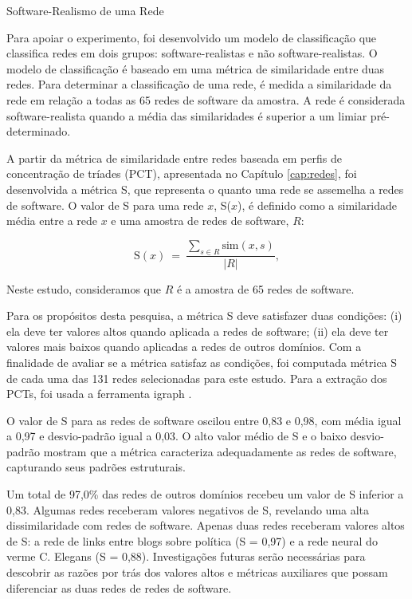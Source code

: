 \begin{section}{Software-Realismo de uma Rede} \label{sec:realismo-rede}

Para apoiar o experimento, foi desenvolvido um modelo de classificação que classifica redes em dois grupos: software-realistas e não software-realistas. O modelo de classificação é baseado em uma métrica de similaridade entre duas redes. Para determinar a classificação de uma rede, é medida a similaridade da rede em relação a todas as 65 redes de software da amostra. A rede é considerada software-realista quando a média das similaridades é superior a um limiar pré-determinado.

A partir da métrica de similaridade entre redes baseada em perfis de concentração de tríades (PCT), apresentada no Capítulo \ref{cap:redes}, foi desenvolvida a métrica S, que representa o quanto uma rede se assemelha a redes de software. O valor de S para uma rede $x$, S($x$), é definido como a similaridade média entre a rede $x$ e uma amostra de redes de software, $R$:

$$
\mathrm{S}(x) ~=~ \frac{
\displaystyle\sum_{s \in R} \mathrm{sim}(x, s)
}{|R|} \mathrm{,}
$$

Neste estudo, consideramos que $R$ é a amostra de 65 redes de software.

Para os propósitos desta pesquisa, a métrica S deve satisfazer duas condições: (i) ela deve ter valores altos quando aplicada a redes de software; (ii) ela deve ter valores mais baixos quando aplicadas a redes de outros domínios. Com a finalidade de avaliar se a métrica satisfaz as condições, foi computada métrica S de cada uma das 131 redes selecionadas para este estudo. Para a extração dos PCTs, foi usada a ferramenta igraph \cite{igraph}.

O valor de S para as redes de software oscilou entre 0,83 e 0,98, com média igual a 0,97 e desvio-padrão igual a 0,03. O alto valor médio de S e o baixo desvio-padrão mostram que a métrica caracteriza adequadamente as redes de software, capturando seus padrões estruturais.

Um total de 97,0\% das redes de outros domínios recebeu um valor de S inferior a 0,83. Algumas redes receberam valores negativos de S, revelando uma alta dissimilaridade com redes de software. Apenas duas redes receberam valores altos de S: a rede de links entre blogs sobre política (S = 0,97) e a rede neural do verme C. Elegans (S = 0,88). Investigações futuras serão necessárias para descobrir as razões por trás dos valores altos e métricas auxiliares que possam diferenciar as duas redes de redes de software.


\end{section}
